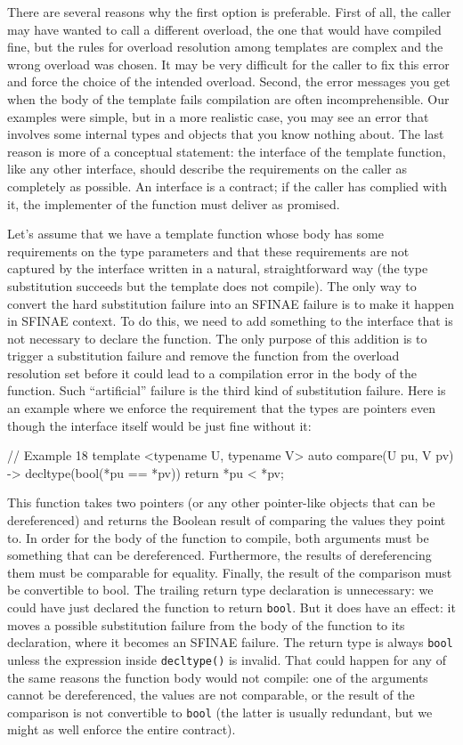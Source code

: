 There are several reasons why the first option is preferable. First of all, the caller may have wanted to call a different overload, the one that would have compiled fine, but the rules for overload resolution among templates are complex and the wrong overload was chosen. It may be very difficult for the caller to fix this error and force the choice of the intended overload. Second, the error messages you get when the body of the template fails compilation are often incomprehensible. Our examples were simple, but in a more realistic case, you may see an error that involves some internal types and objects that you know nothing about. The last reason is more of a conceptual statement: the interface of the template function, like any other interface, should describe the requirements on the caller as completely as possible. An interface is a contract; if the caller has complied with it, the implementer of the function must deliver as promised.

Let's assume that we have a template function whose body has some requirements on the type parameters and that these requirements are not captured by the interface written in a natural, straightforward way (the type substitution succeeds but the template does not compile). The only way to convert the hard substitution failure into an SFINAE failure is to make it happen in SFINAE context. To do this, we need to add something to the interface that is not necessary to declare the function. The only purpose of this addition is to trigger a substitution failure and remove the function from the overload resolution set before it could lead to a compilation error in the body of the function. Such ``artificial'' failure is the third kind of substitution failure. Here is an example where we enforce the requirement that the types are pointers even though the interface itself would be just fine without it:

\begin{code}
// Example 18
template <typename U, typename V>
auto compare(U pu, V pv) -> decltype(bool(*pu == *pv)) {
  return *pu < *pv;
}
\end{code}

This function takes two pointers (or any other pointer-like objects that can be dereferenced) and returns the Boolean result of comparing the values they point to. In order for the body of the function to compile, both arguments must be something that can be dereferenced. Furthermore, the results of dereferencing them must be comparable for equality. Finally, the result of the comparison must be convertible to bool. The trailing return type declaration is unnecessary: we could have just declared the function to return \texttt{bool}. But it does have an effect: it moves a possible substitution failure from the body of the function to its declaration, where it becomes an SFINAE failure. The return type is always \texttt{bool} unless the expression inside \texttt{decltype()} is invalid. That could happen for any of the same reasons the function body would not compile: one of the arguments cannot be dereferenced, the values are not comparable, or the result of the comparison is not convertible to \texttt{bool} (the latter is usually redundant, but we might as well enforce the entire contract).


